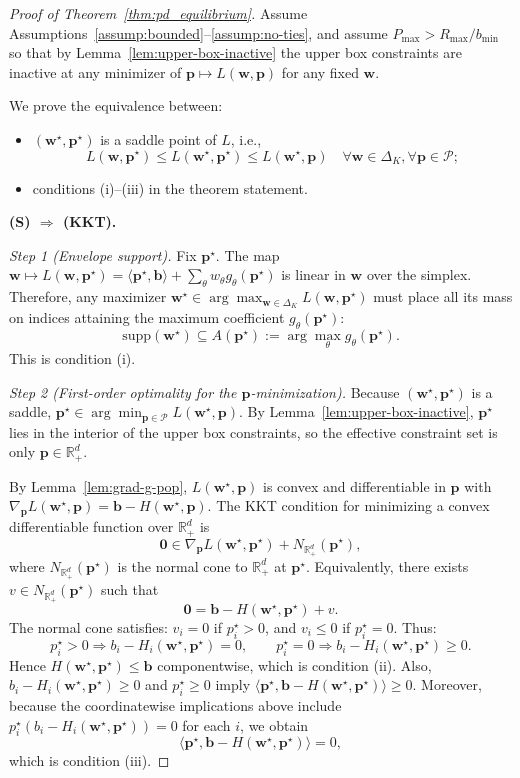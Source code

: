 \documentclass[10pt,a4paper]{amsart}
\newcommand{\R}{\mathbb{R}}
\newcommand{\bb}{\mathbf{b}}
\newcommand{\bp}{\mathbf{p}}
\newcommand{\bw}{\mathbf{w}}
\newcommand{\cP}{\mathcal{P}}
\begin{document}
\begin{proof}[Proof of Theorem~\ref{thm:pd_equilibrium}]
Assume Assumptions~\ref{assump:bounded}--\ref{assump:no-ties}, and assume $P_{\max} > R_{\max}/b_{\min}$ so that by Lemma~\ref{lem:upper-box-inactive} the upper box constraints are inactive at any minimizer of $\bp \mapsto L(\bw, \bp)$ for any fixed $\bw$.

We prove the equivalence between:
\begin{itemize}
\item[(S)] $(\bw^\star, \bp^\star)$ is a saddle point of $L$, i.e.,
\[
L(\bw, \bp^\star) \le L(\bw^\star, \bp^\star) \le L(\bw^\star, \bp) \quad \forall \bw \in \Delta_K, \forall \bp \in \cP;
\]
\item[(KKT)] conditions (i)--(iii) in the theorem statement.
\end{itemize}

\textbf{(S) $\Rightarrow$ (KKT).}

\emph{Step 1 (Envelope support).}
Fix $\bp^\star$. The map $\bw \mapsto L(\bw, \bp^\star) = \langle \bp^\star, \bb \rangle + \sum_{\theta} w_\theta g_\theta(\bp^\star)$ is linear in $\bw$ over the simplex. Therefore, any maximizer $\bw^\star \in \arg\max_{\bw \in \Delta_K} L(\bw, \bp^\star)$ must place all its mass on indices attaining the maximum coefficient $g_\theta(\bp^\star)$:
\[
\mathrm{supp}(\bw^\star) \subseteq A(\bp^\star) := \arg\max_{\theta} g_\theta(\bp^\star).
\]
This is condition (i).

\emph{Step 2 (First-order optimality for the $\bp$-minimization).}
Because $(\bw^\star, \bp^\star)$ is a saddle, $\bp^\star \in \arg\min_{\bp \in \cP} L(\bw^\star, \bp)$.
By Lemma~\ref{lem:upper-box-inactive}, $\bp^\star$ lies in the interior of the upper box constraints, so the effective constraint set is only $\bp \in \R_+^d$.

By Lemma~\ref{lem:grad-g-pop}, $L(\bw^\star, \bp)$ is convex and differentiable in $\bp$ with $\nabla_\bp L(\bw^\star, \bp) = \bb - H(\bw^\star, \bp)$. The KKT condition for minimizing a convex differentiable function over $\R_+^d$ is
\[
\mathbf{0} \in \nabla_\bp L(\bw^\star, \bp^\star) + N_{\R_+^d}(\bp^\star),
\]
where $N_{\R_+^d}(\bp^\star)$ is the normal cone to $\R_+^d$ at $\bp^\star$.
Equivalently, there exists $v \in N_{\R_+^d}(\bp^\star)$ such that
\[
\mathbf{0} = \bb - H(\bw^\star, \bp^\star) + v.
\]
The normal cone satisfies: $v_i = 0$ if $p_i^\star > 0$, and $v_i \le 0$ if $p_i^\star = 0$.
Thus:
\[
p_i^\star > 0 \Rightarrow b_i - H_i(\bw^\star, \bp^\star) = 0, \qquad p_i^\star = 0 \Rightarrow b_i - H_i(\bw^\star, \bp^\star) \ge 0.
\]
Hence $H(\bw^\star, \bp^\star) \le \bb$ componentwise, which is condition (ii). Also, $b_i - H_i(\bw^\star, \bp^\star) \ge 0$ and $p_i^\star \ge 0$ imply $\langle \bp^\star, \bb - H(\bw^\star, \bp^\star) \rangle \ge 0$. Moreover, because the coordinatewise implications above include $p_i^\star(b_i - H_i(\bw^\star, \bp^\star)) = 0$ for each $i$, we obtain
\[
\langle \bp^\star, \bb - H(\bw^\star, \bp^\star) \rangle = 0,
\]
which is condition (iii).


\end{proof}
\end{document}
